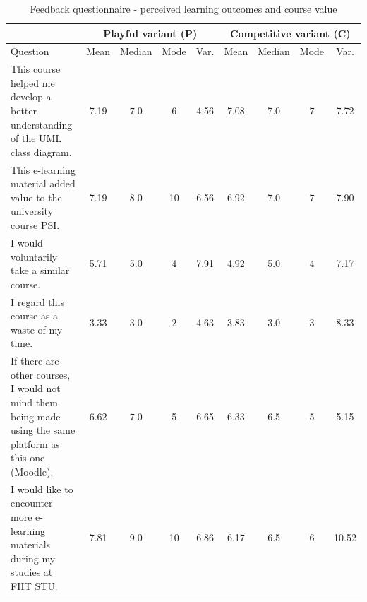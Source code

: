 \FloatBarrier
\begin{table}[h]
\centering
\small
\renewcommand{\arraystretch}{1.2}
\begin{tabular}{>{\raggedright\arraybackslash}p{4cm}|cccc|cccc}
\hline
 & \multicolumn{4}{c|}{Playful variant (P)} & \multicolumn{4}{c}{Competitive variant (C)} \\
\hline
Question & Mean & Median & Mode & Var. & Mean & Median & Mode & Var. \\
\hline

This course helped me develop a better understanding of the UML class diagram. 
& 7.19 & 7.0 & 6 & 4.56 & 7.08 & 7.0 & 7 & 7.72 \\

This e-learning material added value to the university course PSI. 
& 7.19 & 8.0 & 10 & 6.56 & 6.92 & 7.0 & 7 & 7.90 \\

I would voluntarily take a similar course. 
& 5.71 & 5.0 & 4 & 7.91 & 4.92 & 5.0 & 4 & 7.17 \\

I regard this course as a waste of my time. 
& 3.33 & 3.0 & 2 & 4.63 & 3.83 & 3.0 & 3 & 8.33 \\

If there are other courses, I would not mind them being made using the same platform as this one (Moodle). 
& 6.62 & 7.0 & 5 & 6.65 & 6.33 & 6.5 & 5 & 5.15 \\

I would like to encounter more e-learning materials during my studies at FIIT STU. 
& 7.81 & 9.0 & 10 & 6.86 & 6.17 & 6.5 & 6 & 10.52 \\

\hline
\end{tabular}
\caption{Feedback questionnaire - perceived learning outcomes and course value}
\end{table}
\FloatBarrier

